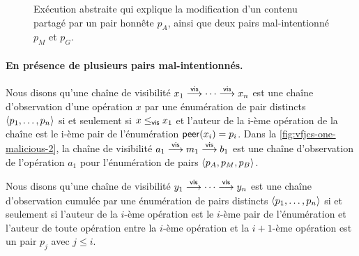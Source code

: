 \begin{figure}[htb]
\centering
{}
\caption{Exécution abstraite qui explique la modification d'un contenu partagé par un pair honnête $p_A$, ainsi que deux pairs mal-intentionné $p_M$ et $p_G$.}\label{fig:vfjc-two-malicious-obs}
\end{figure}

\paragraph{En présence de plusieurs pairs mal-intentionnés.}
Nous disons qu'une chaîne de visibilité $x_1 \vis \dotsb \vis x_n$ est une chaîne d'observation d'une opération $x$ par une énumération de pair distincts $\tuple*{p_1, \dotsc, p_n}$ si et seulement si $x \viseq x_1$ et l'auteur de la i-ème opération de la chaîne est le i-ème pair de l'énumération $\trm{peer}(x_i) = p_i$.
Dans la \autoref{fig:vfjcs-one-malicious-2}, la chaîne de visibilité $a_1 \vis m_1 \vis b_1$ est une chaîne d'observation de l'opération $a_1$ pour l'énumération de pairs $\tuple*{p_A, p_M, p_B}$.

Nous disons qu'une chaîne de visibilité $y_1 \vis \dotsb \vis y_n$ est une chaîne d'observation cumulée par une énumération de pairs distincts $\tuple*{p_1, \dotsc, p_n}$ si et seulement si l'auteur de la $i$-ème opération est le $i$-ème pair de l'énumération et l'auteur de toute opération entre la $i$-ème opération et la $i+1$-ème opération est un pair $p_j$ avec $j \leq i$.

